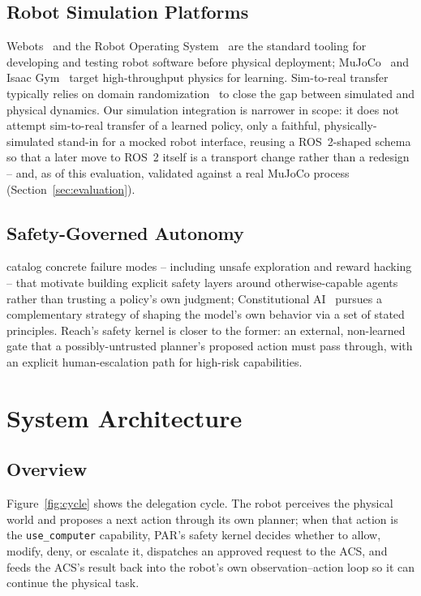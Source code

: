 \documentclass{article}
\begin{document}
\subsection{Robot Simulation Platforms}
Webots~\citep{michel2004webots} and the Robot Operating System~\citep{quigley2009ros} are the standard tooling for developing and testing robot software before physical deployment; MuJoCo~\citep{todorov2012mujoco} and Isaac Gym~\citep{makoviychuk2021isaacgym} target high-throughput physics for learning. Sim-to-real transfer typically relies on domain randomization~\citep{tobin2017domain, peng2018simtoreal} to close the gap between simulated and physical dynamics. Our simulation integration is narrower in scope: it does not attempt sim-to-real transfer of a learned policy, only a faithful, physically-simulated stand-in for a mocked robot interface, reusing a ROS~2-shaped schema so that a later move to ROS~2 itself is a transport change rather than a redesign -- and, as of this evaluation, validated against a real MuJoCo process (Section~\ref{sec:evaluation}).

\subsection{Safety-Governed Autonomy}
\citet{amodei2016concrete} catalog concrete failure modes -- including unsafe exploration and reward hacking -- that motivate building explicit safety layers around otherwise-capable agents rather than trusting a policy's own judgment; Constitutional AI~\citep{bai2022constitutional} pursues a complementary strategy of shaping the model's own behavior via a set of stated principles. Reach's safety kernel is closer to the former: an external, non-learned gate that a possibly-untrusted planner's proposed action must pass through, with an explicit human-escalation path for high-risk capabilities.


\section{System Architecture}

\subsection{Overview}
Figure~\ref{fig:cycle} shows the delegation cycle. The robot perceives the physical world and proposes a next action through its own planner; when that action is the \texttt{use\_computer} capability, PAR's safety kernel decides whether to allow, modify, deny, or escalate it, dispatches an approved request to the ACS, and feeds the ACS's result back into the robot's own observation--action loop so it can continue the physical task.
\end{document}
